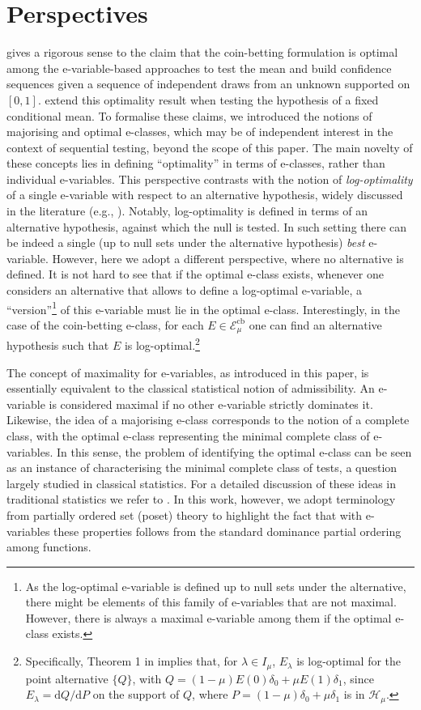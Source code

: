 \documentclass[3p, authoryear, 10pt]{elsarticle}%
\newcommand{\dd}{\mathrm{d}}
\newcommand{\Ecb}{\mathcal E^{\mathrm{cb}}}
\newcommand{\Hh}{\mathcal H}
\begin{document}
\section{Perspectives}\label{sec:perspectives}
 gives a rigorous sense to the claim that the coin-betting formulation is optimal among the e-variable-based approaches to test the mean and build confidence sequences given a sequence of independent draws from an unknown supported on $[0,1]$.   extend this optimality result when testing the hypothesis of a fixed conditional mean. To formalise these claims, we introduced the notions of majorising and optimal e-classes, which may be of independent interest in the context of sequential testing, beyond the scope of this paper. The main novelty of these concepts lies in defining ``optimality'' in terms of e-classes, rather than individual e-variables. This perspective contrasts with the notion of \emph{log-optimality} of a single e-variable with respect to an alternative hypothesis, widely discussed in the literature (e.g., \citealp{koolen2022log,grunwald2024safe, larsson2024numeraire}). Notably, log-optimality is defined in terms of an alternative hypothesis, against which the null is tested. In such setting there can be indeed a single (up to null sets under the alternative hypothesis) \emph{best} e-variable. However, here we adopt a different perspective, where no alternative is defined. It is not hard to see that if the optimal e-class exists, whenever one considers an alternative that allows to define a log-optimal e-variable, a ``version''\footnote{As the log-optimal e-variable is defined up to null sets under the alternative, there might be elements of this family of e-variables that are not maximal. However, there is always a maximal e-variable among them if the optimal e-class exists.} of this e-variable must lie in the optimal e-class. Interestingly, in the case of the coin-betting e-class, for each $E\in\Ecb_\mu$ one can find an alternative hypothesis such that $E$ is log-optimal.\footnote{Specifically, Theorem 1 in \cite{grunwald2024safe} implies that, for $\lambda\in I_\mu$, $E_\lambda$ is log-optimal for the point alternative $\{Q\}$, with $Q = (1-\mu)E(0)\delta_0 + \mu E(1)\delta_1$, since $E_\lambda = \dd Q/\dd P$ on the support of $Q$, where $P = (1-\mu)\delta_0 + \mu\delta_1$ is in $\Hh_\mu$.}

The concept of maximality for e-variables, as introduced in this paper, is essentially equivalent to the classical statistical notion of admissibility. An e-variable is considered maximal if no other e-variable strictly dominates it. Likewise, the idea of a majorising e-class corresponds to the notion of a complete class, with the optimal e-class representing the minimal complete class of e-variables. In this sense, the problem of identifying the optimal e-class can be seen as an instance of characterising the minimal complete class of tests, a question largely studied in classical statistics. For a detailed discussion of these ideas in traditional statistics we refer to \cite{lehmann2005testing}. In this work, however, we adopt terminology from partially ordered set (poset) theory to highlight the fact that with e-variables these properties follows from the standard dominance partial ordering among functions. 
\end{document}
